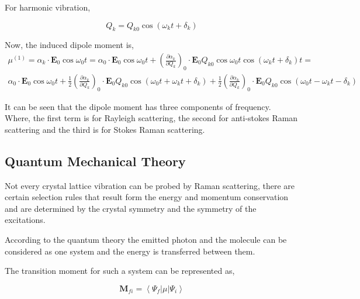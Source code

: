 \documentclass[openany,11pt,a4paper]{report}
\begin{document}
For harmonic vibration,

\begin{equation}
Q_{k}=Q_{k 0} \cos \left(\omega_{k} t+\delta_{k}\right)
\end{equation}

Now, the induced dipole moment is,
\begin{equation}
\begin{array}{c}{\mu^{(1)}=\alpha_{k} \cdot \mathbf{E}_{0} \cos \omega_{0} t=\alpha_{0} \cdot \mathbf{E}_{0} \cos \omega_{0} t+\left(\frac{\partial \alpha_{k}}{\partial Q_{k}}\right)_{0} \cdot \mathbf{E}_{0} Q_{k 0} \cos \omega_{0} t \cos \left(\omega_{k} t+\delta_{k}\right) t=} \\ {\alpha_{0} \cdot \mathbf{E}_{0} \cos \omega_{0} t+\frac{1}{2}\left(\frac{\partial \alpha_{k}}{\partial Q_{k}}\right)_{0} \cdot \mathbf{E}_{0} Q_{k 0} \cos \left(\omega_{0} t+\omega_{k} t+\delta_{k}\right)+\frac{1}{2}\left(\frac{\partial \alpha_{k}}{\partial Q_{k}}\right)_{0} \cdot \mathbf{E}_{0} Q_{k 0} \cos \left(\omega_{0} t-\omega_{k} t-\delta_{k}\right)}\end{array}
\end{equation}

It can be seen that the dipole moment has three components of frequency.  Where, the first term is for Rayleigh scattering, the second for anti-stokes Raman scattering and the third is for Stokes Raman scattering. \cite{bib2}  


\subsection{Quantum Mechanical Theory}


Not every crystal lattice vibration can be probed by Raman scattering, there are certain selection rules that result form the energy and momentum conservation and are determined by the crystal symmetry and the symmetry of the excitations.






According to the quantum theory the emitted photon and the molecule can be considered as one system and the energy is transferred between them. 

The transition moment for such a system can be represented as,

\begin{equation}
\mathbf{M}_{f i}=\left\langle\Psi_{f}|\mu| \Psi_{i}\right\rangle
\end{equation} 
\end{document}
